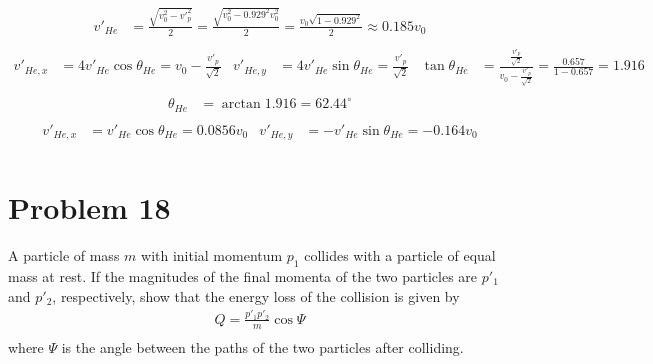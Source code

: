 \documentclass[]{article}
\begin{document}
	\begin{equation}
		\begin{split}
			v'_{He} &= \frac{\sqrt{v^2_0 - v'^2_p}}{2} = \frac{\sqrt{v^2_0 - 0.929^2 v^2_0}}{2} = \frac{v_0\sqrt{1 - 0.929^2}}{2} \approx 0.185 v_0 \\
		\end{split}
	\end{equation}
	\begin{equation}
		\begin{aligned}
			v'_{He, x} &= 4v'_{He} \cos \theta_{He} = v_0 - \frac{v'_p}{\sqrt{2}} & v'_{He, y} &= 4v'_{He} \sin \theta_{He} = \frac{v'_p}{\sqrt{2}} & \tan \theta_{He} &= \frac{\frac{v'_p}{\sqrt{2}}}{v_0 - \frac{v'_p}{\sqrt{2}}} = \frac{0.657}{1 - 0.657} = 1.916 \\
		\end{aligned}
	\end{equation}
	\begin{equation}
		\begin{aligned}
			\theta_{He} &= \arctan 1.916 = 62.44^{\circ} \\
		\end{aligned}
	\end{equation}
	\begin{equation}
		\begin{aligned}
			v'_{He, x} &= v'_{He} \cos \theta_{He} = 0.0856v_0 & v'_{He, y} &= -v'_{He} \sin \theta_{He} = -0.164v_0 \\
		\end{aligned}
	\end{equation}

	\clearpage

	\section{Problem 18}
	
	A particle of mass $m$ with initial momentum $p_1$ collides with a particle of equal mass at rest. If the magnitudes of the final momenta of the two particles are $p'_1$ and $p'_2$, respectively, show that the energy loss of the collision is given by
	\begin{equation}
		\begin{split}
			Q = \frac{p'_1 p'_2}{m}\cos \varPsi \\
		\end{split}
	\end{equation}
	where $\varPsi$ is the angle between the paths of the two particles after colliding. \\
	
\end{document}
